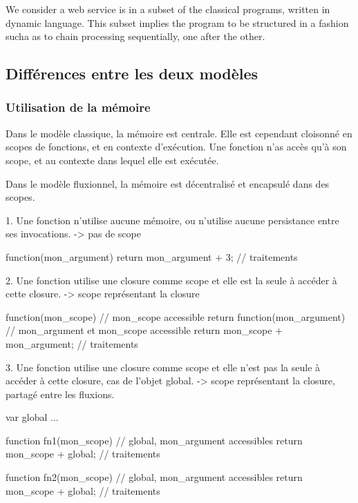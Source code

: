 	We consider a web service is in a subset of the classical programs, written in dynamic language.
	This subset implies the program to be structured in a fashion sucha as to chain processing sequentially, one after the other.

	\subsection{Différences entre les deux modèles}

		\subsubsection{Utilisation de la mémoire}

			Dans le modèle classique, la mémoire est centrale.
			Elle est cependant cloisonné en scopes de fonctions, et en contexte d'exécution.
			Une fonction n'as accès qu'à son scope, et au contexte dans lequel elle est exécutée.

			Dans le modèle fluxionnel, la mémoire est décentralisé et encapsulé dans des scopes.

			1. Une fonction n'utilise aucune mémoire, ou n'utilise aucune persistance entre ses invocations.
			    -> pas de scope

			\begin{code}[Javascript, caption={Code fluxionnel},label={lst:mem1}]
				function(mon_argument) {
				    return mon_argument + 3; // traitements
				}
			\end{code}


			2. Une fonction utilise une closure comme scope et elle est la seule à accéder à cette closure.
			    -> scope représentant la closure

			\begin{code}[Javascript, caption={Code fluxionnel},label={lst:mem2}]
				function(mon_scope) {
				    // mon_scope accessible
				    return function(mon_argument) {
				        // mon_argument et mon_scope accessible
				        return mon_scope + mon_argument; // traitements
				    }
				}
			\end{code}

			3. Une fonction utilise une closure comme scope et elle n'est pas la seule à accéder à cette closure, cas de l'objet global.
			    -> scope représentant la closure, partagé entre les fluxions.

			\begin{code}[Javascript, caption={Code fluxionnel},label={lst:mem3}]
				var global ...

				function fn1(mon_scope) {
				    // global, mon_argument accessibles
				    return mon_scope + global; // traitements
				}

				function fn2(mon_scope) {
				    // global, mon_argument accessibles
				    return mon_scope + global; // traitements
				}
			\end{code}

